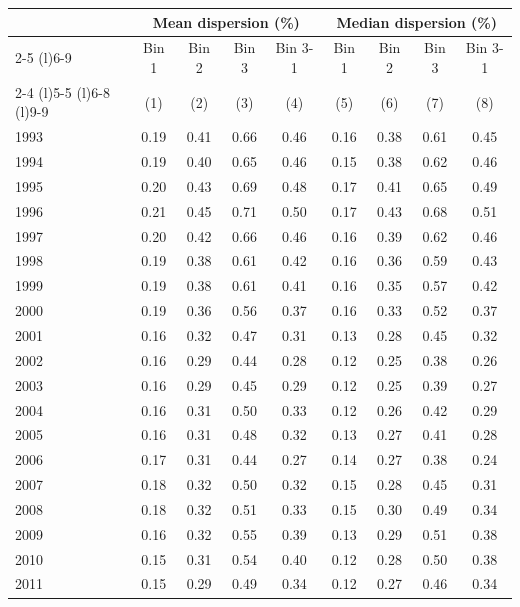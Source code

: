 \begin{tabular}{lcccccccc}
  \toprule & \multicolumn{4}{c}{Mean dispersion (\%)} & \multicolumn{4}{c}{Median dispersion (\%)} \\
 \cmidrule(l){2-5} \cmidrule(l){6-9}
 & Bin 1 & Bin 2 & Bin 3 & Bin 3-1 & Bin 1 & Bin 2 & Bin 3 & Bin 3-1 \\ 
  \cmidrule(l){2-4} \cmidrule(l){5-5} \cmidrule(l){6-8} \cmidrule(l){9-9}
 \vspace{5pt} & (1) & (2) & (3) & (4) & (5) & (6) & (7) & (8) \\ 
  1993 & 0.19 & 0.41 & 0.66 & 0.46 & 0.16 & 0.38 & 0.61 & 0.45 \\ 
  1994 & 0.19 & 0.40 & 0.65 & 0.46 & 0.15 & 0.38 & 0.62 & 0.46 \\ 
  1995 & 0.20 & 0.43 & 0.69 & 0.48 & 0.17 & 0.41 & 0.65 & 0.49 \\ 
  1996 & 0.21 & 0.45 & 0.71 & 0.50 & 0.17 & 0.43 & 0.68 & 0.51 \\ 
  1997 & 0.20 & 0.42 & 0.66 & 0.46 & 0.16 & 0.39 & 0.62 & 0.46 \\ 
  1998 & 0.19 & 0.38 & 0.61 & 0.42 & 0.16 & 0.36 & 0.59 & 0.43 \\ 
  1999 & 0.19 & 0.38 & 0.61 & 0.41 & 0.16 & 0.35 & 0.57 & 0.42 \\ 
  2000 & 0.19 & 0.36 & 0.56 & 0.37 & 0.16 & 0.33 & 0.52 & 0.37 \\ 
  2001 & 0.16 & 0.32 & 0.47 & 0.31 & 0.13 & 0.28 & 0.45 & 0.32 \\ 
  2002 & 0.16 & 0.29 & 0.44 & 0.28 & 0.12 & 0.25 & 0.38 & 0.26 \\ 
  2003 & 0.16 & 0.29 & 0.45 & 0.29 & 0.12 & 0.25 & 0.39 & 0.27 \\ 
  2004 & 0.16 & 0.31 & 0.50 & 0.33 & 0.12 & 0.26 & 0.42 & 0.29 \\ 
  2005 & 0.16 & 0.31 & 0.48 & 0.32 & 0.13 & 0.27 & 0.41 & 0.28 \\ 
  2006 & 0.17 & 0.31 & 0.44 & 0.27 & 0.14 & 0.27 & 0.38 & 0.24 \\ 
  2007 & 0.18 & 0.32 & 0.50 & 0.32 & 0.15 & 0.28 & 0.45 & 0.31 \\ 
  2008 & 0.18 & 0.32 & 0.51 & 0.33 & 0.15 & 0.30 & 0.49 & 0.34 \\ 
  2009 & 0.16 & 0.32 & 0.55 & 0.39 & 0.13 & 0.29 & 0.51 & 0.38 \\ 
  2010 & 0.15 & 0.31 & 0.54 & 0.40 & 0.12 & 0.28 & 0.50 & 0.38 \\ 
  2011 & 0.15 & 0.29 & 0.49 & 0.34 & 0.12 & 0.27 & 0.46 & 0.34 \\ 

\end{tabular}
